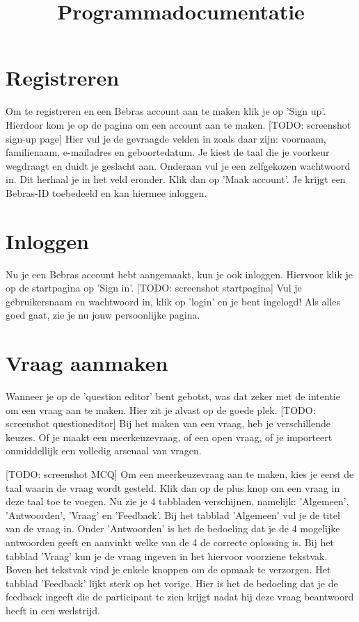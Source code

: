 \documentclass[]{article}
\title{
    Programmadocumentatie
}
\begin{document}
\maketitle

\section*{Registreren}
Om te registreren en een Bebras account aan te maken klik je op 'Sign up'. Hierdoor kom je op de pagina om een account aan te maken. [TODO: screenshot sign-up page] Hier vul je de gevraagde velden in zoals daar zijn: voornaam, familienaam, e-mailadres en geboortedatum. Je kiest de taal die je voorkeur wegdraagt en duidt je geslacht aan. Onderaan vul je een zelfgekozen wachtwoord in. Dit herhaal je in het veld eronder. Klik dan op 'Maak account'. Je krijgt een Bebras-ID toebedeeld en kan hiermee inloggen.

\section*{Inloggen}
Nu je een Bebras account hebt aangemaakt, kun je ook inloggen. Hiervoor klik je op de startpagina op 'Sign in'. [TODO: screenshot startpagina] Vul je gebruikersnaam en wachtwoord in, klik op 'login' en je bent ingelogd! Als alles goed gaat, zie je nu jouw persoonlijke pagina.

\section*{Vraag aanmaken}
Wanneer je op de 'question editor' bent gebotst, was dat zeker met de intentie om een vraag aan te maken. Hier zit je alvast op de goede plek. [TODO: screenshot questioneditor] Bij het maken van een vraag, heb je verschillende keuzes. Of je maakt een meerkeuzevraag, of een open vraag, of je importeert onmiddellijk een volledig arsenaal van vragen. 

[TODO: screenshot MCQ] Om een meerkeuzevraag aan te maken, kies je eerst de taal waarin de vraag wordt gesteld. Klik dan op de plus knop om een vraag in deze taal toe te voegen. Nu zie je 4 tabbladen verschijnen, namelijk: 'Algemeen', 'Antwoorden', 'Vraag' en 'Feedback'. Bij het tabblad 'Algemeen' vul je de titel van de vraag in. Onder 'Antwoorden' is het de bedoeling dat je de 4 mogelijke antwoorden geeft en aanvinkt welke van de 4 de correcte oplossing is. Bij het tabblad 'Vraag' kun je de vraag ingeven in het hiervoor voorziene tekstvak. Boven het tekstvak vind je enkele knoppen om de opmaak te verzorgen. Het tabblad 'Feedback' lijkt sterk op het vorige. Hier is het de bedoeling dat je de feedback ingeeft die de participant te zien krijgt nadat hij deze vraag beantwoord heeft in een wedstrijd. 
\end{document}
